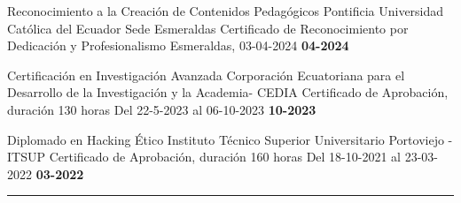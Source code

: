 \begin{paracol}{2}
\begin{rightcolumn}
\begin{dport}
	\pvevent
	{Reconocimiento a la Creación de Contenidos Pedagógicos}
	{Pontificia Universidad Católica del Ecuador Sede Esmeraldas}
	{Certificado de Reconocimiento por Dedicación y Profesionalismo}
	{Esmeraldas, 03-04-2024}
	{\textbf{04-2024}}
\end{dport}

\begin{lport}
	\pvevent
	{Certificación en Investigación Avanzada}
	{Corporación Ecuatoriana para el Desarrollo de la Investigación y la Academia-
	CEDIA}
	{Certificado de Aprobación, duración 130 horas}
	{Del 22-5-2023 al 06-10-2023}
	{\textbf{10-2023}}
\end{lport}





\begin{lport}
	\pvevent
	{Diplomado en Hacking Ético}
	{Instituto Técnico Superior Universitario Portoviejo - ITSUP}
	{Certificado de Aprobación, duración 160 horas}
	{Del 18-10-2021 al 23-03-2022}
	{\textbf{03-2022}}
	
\end{lport}



\end{rightcolumn}
\end{paracol}
\setlength{\parindent}{0pt}
\textcolor{lightcol}{ \rule{1.02\textwidth}{3pt} }


